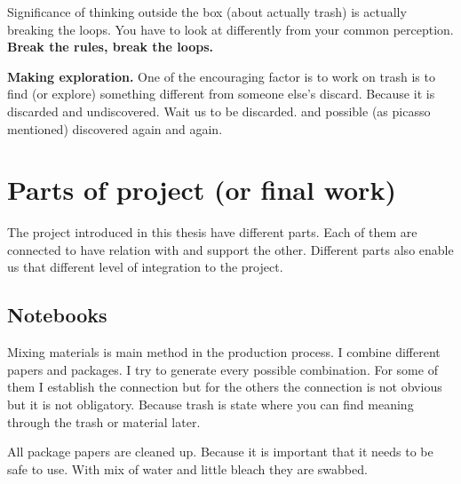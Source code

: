Significance of thinking outside the box (about actually trash) is actually breaking the loops. You have to look at differently from your common perception. \textbf{Break the rules, break the loops.}

\textbf{Making exploration.} One of the encouraging factor is to work on trash is to find (or explore) something different from someone else's discard. Because it is discarded and undiscovered. Wait us to be discarded. and possible (as picasso mentioned) discovered again and again. 

\section{Parts of project (or final work)}
The project introduced in this thesis have different parts. Each of them are connected to have relation with and support the other. Different parts also enable us that different level of integration to the project. 

\subsection{Notebooks}
Mixing materials is main method in the production process. I combine different papers and packages. I try to generate every possible combination. For some of them I establish the connection but for the others the connection is not obvious but it is not obligatory. Because trash is state where you can find meaning through the trash or material later. 

All package papers are cleaned up. Because it is important that it needs to be safe to use. With mix of water and little bleach they are swabbed. 

